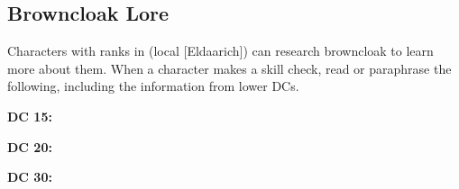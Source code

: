 \subsection{Browncloak Lore}
Characters with ranks in  (local [Eldaarich]) can research browncloak to learn more about them. When a character makes a skill check, read or paraphrase the following, including the information from lower DCs.

\textbf{DC 15:} 

\textbf{DC 20:}

\textbf{DC 30:}